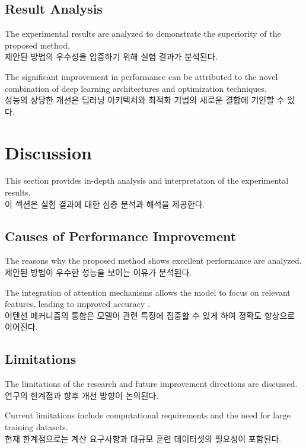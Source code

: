 \documentclass[12pt,a4paper]{article}
\begin{document}
\subsection{Result Analysis}
The experimental results are analyzed to demonstrate the superiority of the proposed method. \\
제안된 방법의 우수성을 입증하기 위해 실험 결과가 분석된다.

The significant improvement in performance can be attributed to the novel combination of deep learning architectures and optimization techniques. \\
성능의 상당한 개선은 딥러닝 아키텍처와 최적화 기법의 새로운 결합에 기인할 수 있다.

\section{Discussion}
\label{sec:discussion}

This section provides in-depth analysis and interpretation of the experimental results. \\
이 섹션은 실험 결과에 대한 심층 분석과 해석을 제공한다.

\subsection{Causes of Performance Improvement}
The reasons why the proposed method shows excellent performance are analyzed. \\
제안된 방법이 우수한 성능을 보이는 이유가 분석된다.

The integration of attention mechanisms allows the model to focus on relevant features, leading to improved accuracy \cite{bahdanau2014neural}. \\
어텐션 메커니즘의 통합은 모델이 관련 특징에 집중할 수 있게 하여 정확도 향상으로 이어진다.

\subsection{Limitations}
The limitations of the research and future improvement directions are discussed. \\
연구의 한계점과 향후 개선 방향이 논의된다.

Current limitations include computational requirements and the need for large training datasets. \\
현재 한계점으로는 계산 요구사항과 대규모 훈련 데이터셋의 필요성이 포함된다.
\end{document}
